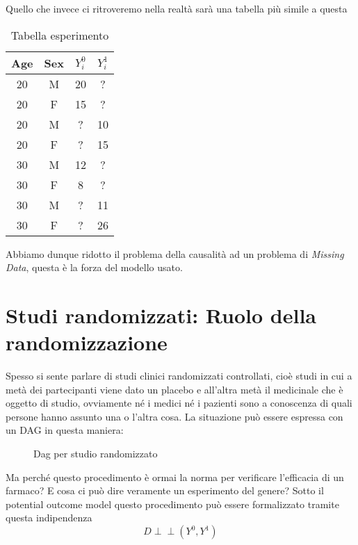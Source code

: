 Quello che invece ci ritroveremo nella realtà sarà una tabella più simile a questa 
\begin{table}[H]
\centering
\begin{tabular}{|c|c|c|c|}
\hline
Age & Sex & $Y^{0}_i$ & $Y^{1}_i$ \\ \hline
20 & M & 20 & ?  \\ \hline
20 & F & 15 & ? \\ \hline
20 & M & ? & 10 \\ \hline
20 & F & ? & 15  \\ \hline
30 & M & 12 & ? \\ \hline
30 & F & 8 & ? \\ \hline
30 & M & ? & 11   \\ \hline
30 & F & ? & 26 \\ \hline
\end{tabular}
\caption{Tabella esperimento }
\end{table}
Abbiamo dunque ridotto il problema della causalità ad un problema di \textit{Missing Data}, questa è la forza del modello usato.

\section{Studi randomizzati: Ruolo della randomizzazione}
Spesso si sente parlare di studi clinici randomizzati controllati, cioè studi in cui a metà dei partecipanti viene dato un placebo e all'altra metà il medicinale che è oggetto di studio, ovviamente né i medici né i pazienti sono a conoscenza di quali persone hanno assunto una o l'altra cosa. La situazione può essere espressa con un DAG in questa maniera: 
\begin{figure}[H]
\centering
\caption{Dag per studio randomizzato}
\label{fig:dag_random_EX}
\end{figure}
Ma perché questo procedimento è ormai la norma per verificare l'efficacia di un farmaco? E cosa ci può dire veramente un esperimento del genere? Sotto il potential outcome model questo procedimento può essere formalizzato tramite questa indipendenza
\begin{equation}
D \perp\!\!\!\perp (Y^{0},Y^{1})
\end{equation}
\label{eq:indipendence_r}

